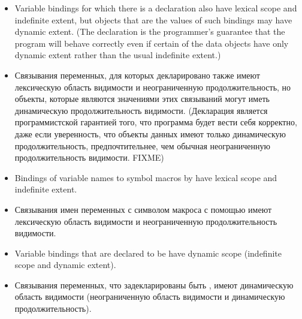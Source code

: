 \begin{newer}
\begin{itemize}
\item Variable bindings for which there is a 
declaration also have lexical scope and indefinite extent,
but objects that are the values of such bindings may have
dynamic extent.
(The declaration is the programmer's guarantee that
the program will behave correctly even if certain of the data objects have only
dynamic extent rather than the usual indefinite extent.)

\item Связывания переменных, для которых декларировано  также
 имеют лексическую область видимости и неограниченную продолжительность, но
 объекты, которые являются значениями этих связываний могут иметь динамическую
 продолжительность видимости.
(Декларация является программистской гарантией того, что программа будет вести
себя корректно, даже если уверенность, что объекты данных имеют только
динамическую продолжительность, предпочтительнее, чем обычная неограниченную
продолжительность видимости. FIXME)

\item Bindings of variable names to symbol macros by
 have lexical scope and indefinite extent.

\item Связывания имен переменных с символом макроса с помощью
   имеют лексическую область видимости и неограниченную
  продолжительность видимости.
\end{itemize}
\end{newer}

\begin{itemize}
\item
Variable bindings that are declared to be  have dynamic scope
(indefinite scope and dynamic extent).

\item 
Связывания переменных, что задекларированы быть ,
имеют динамическую область видимости (неограниченную область видимости и
динамическую продолжительность).
\end{itemize}

